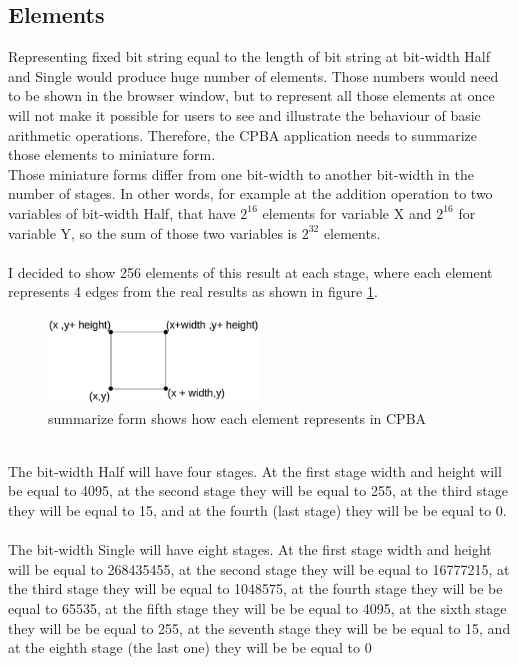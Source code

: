 \documentclass[11pt]{article}
\begin{document}
\subsection{Elements}
Representing fixed bit string equal to the length of bit string at bit-width Half and Single would produce huge number of elements. Those numbers would need to be shown in the browser window, but to represent all those elements at once will not make it possible for users to see and illustrate the behaviour of basic arithmetic operations. Therefore, the CPBA application needs to summarize those elements to miniature form.\\
Those miniature forms differ from one bit-width to another bit-width in the number of stages. In other words, for example at the addition operation to two variables of bit-width Half, that have $2^{16}$ elements for variable X and $2^{16}$ for variable Y, so the sum of those two variables is $2^{32}$ elements.\\\\
I decided to show 256 elements of this result at each stage, where each element represents 4 edges from the real results as shown in figure \ref{edges}.\\
\begin{figure}[h]
    \centering
    \includegraphics[width=0.5\textwidth]{edges}
    \caption{summarize form shows how each element represents in CPBA}
    \label{edges}
\end{figure}\\
The bit-width Half will have four stages. At the first stage width and height will be equal to 4095, at the second stage they will be equal to 255, at the third stage they will be equal to 15,  and at the fourth (last stage) they will be be equal to 0.\\\\
The bit-width Single will have eight stages. At the first stage width and height will be equal to 268435455, at the second stage they will be equal to 16777215, at the third stage they will be equal to 1048575, at the fourth stage they will be be equal to 65535, at the fifth stage they will be be equal to 4095, at the sixth stage they will be be equal to 255, at the seventh stage they will be be equal to 15, and at the eighth stage (the last one) they will be be equal to 0\\\\
\end{document}

